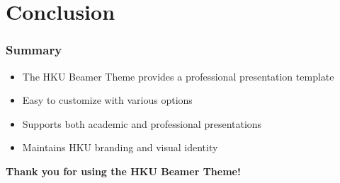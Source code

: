 \section{Conclusion}

\begin{frame}
	\frametitle{Summary}
	\begin{itemize}
		\item The HKU Beamer Theme provides a professional presentation template
		\item Easy to customize with various options
		\item Supports both academic and professional presentations
		\item Maintains HKU branding and visual identity
	\end{itemize}
	
	\vspace{1cm}
	\centering
	\textbf{Thank you for using the HKU Beamer Theme!}
\end{frame} 